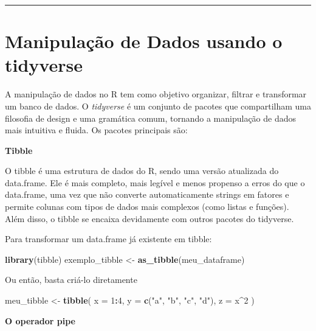 \documentclass[
]{book}
\newenvironment{Shaded}{\begin{snugshade}}{\end{snugshade}}
\newcommand{\AttributeTok}[1]{\textcolor[rgb]{0.13,0.29,0.53}{#1}}
\newcommand{\DecValTok}[1]{\textcolor[rgb]{0.00,0.00,0.81}{#1}}
\newcommand{\FunctionTok}[1]{\textcolor[rgb]{0.13,0.29,0.53}{\textbf{#1}}}
\newcommand{\NormalTok}[1]{#1}
\newcommand{\OtherTok}[1]{\textcolor[rgb]{0.56,0.35,0.01}{#1}}
\newcommand{\SpecialCharTok}[1]{\textcolor[rgb]{0.81,0.36,0.00}{\textbf{#1}}}
\newcommand{\StringTok}[1]{\textcolor[rgb]{0.31,0.60,0.02}{#1}}
\begin{document}
\begin{center}\rule{0.5\linewidth}{0.5pt}\end{center}

\section{Manipulação de Dados usando o tidyverse}\label{manipulauxe7uxe3o-de-dados-usando-o-tidyverse}

A manipulação de dados no R tem como objetivo organizar, filtrar e transformar um banco de dados. O \emph{tidyverse} é um conjunto de pacotes que compartilham uma filosofia de design e uma gramática comum, tornando a manipulação de dados mais intuitiva e fluida. Os pacotes principais são:

\textbf{Tibble}

O tibble é uma estrutura de dados do R, sendo uma versão atualizada do data.frame. Ele é mais completo, mais legível e menos propenso a erros do que o data.frame, uma vez que não converte automaticamente strings em fatores e permite colunas com tipos de dados mais complexos (como listas e funções). Além disso, o tibble se encaixa devidamente com outros pacotes do tidyverse.

Para transformar um data.frame já existente em tibble:

\begin{Shaded}
\begin{Highlighting}[]
\FunctionTok{library}\NormalTok{(tibble)}
\NormalTok{exemplo\_tibble }\OtherTok{\textless{}{-}} \FunctionTok{as\_tibble}\NormalTok{(meu\_dataframe)}
\end{Highlighting}
\end{Shaded}

Ou então, basta criá-lo diretamente

\begin{Shaded}
\begin{Highlighting}[]
\NormalTok{meu\_tibble }\OtherTok{\textless{}{-}} \FunctionTok{tibble}\NormalTok{(}
  \AttributeTok{x =} \DecValTok{1}\SpecialCharTok{:}\DecValTok{4}\NormalTok{,}
  \AttributeTok{y =} \FunctionTok{c}\NormalTok{(}\StringTok{"a"}\NormalTok{, }\StringTok{"b"}\NormalTok{, }\StringTok{"c"}\NormalTok{, }\StringTok{"d"}\NormalTok{),}
  \AttributeTok{z =}\NormalTok{ x}\SpecialCharTok{\^{}}\DecValTok{2}
\NormalTok{)}
\end{Highlighting}
\end{Shaded}

\textbf{O operador pipe}
\end{document}
